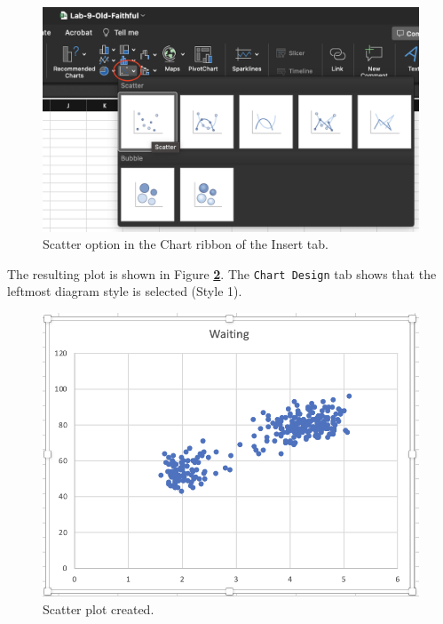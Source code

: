 \documentclass[
]{book}
\begin{document}
\begin{figure}

{\centering \includegraphics[width=0.65\linewidth]{scatter-plot} 

}

\caption{ Scatter option in the Chart ribbon of the Insert tab.}\label{fig:scatter-plot}
\end{figure}

The resulting plot is shown in Figure \textbf{\ref{fig:resulting-scatter-plot}}. The \texttt{Chart\ Design} tab shows that the leftmost diagram style is selected (Style 1).

\begin{figure}

{\centering \includegraphics[width=0.65\linewidth]{resulting-scatter-plot} 

}

\caption{ Scatter plot created.}\label{fig:resulting-scatter-plot}
\end{figure}
\end{document}
